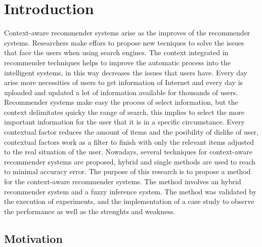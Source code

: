 \chapter{Introduction} \label{introduction} 

Context-aware recommender systems arise as the improves of 
the recommender systems. Researchers make effors to propose 
new tecniques to solve the issues that face the users when using 
search engines. The context integrated in recommender techniques 
helps to improve the automatic process into the intelligent systems, 
in this way decreases the issues that users have.
Every day arise more necessities of users to get information of  
Internet and every day  is uploaded and updated a lot of 
information available for thousands of users.
Recommender systems make easy the process of select information, but
the context delimitates quicky the range of search, this implies
to select the more important information for the user that it is 
in a specific circumstance. Every contextual factor reduces the
amount of items and the posibility of dislike of user, 
contextual factors work as a filter to finish with only 
the relevant items adjusted to the real situation of the user.
Nowadays, several techniques for context-aware recommender
systems are proposed, hybrid and single methods are used to
reach to minimal accuracy error. 
The purpose of this research is to propose a method for the
context-aware recommender systems. The method involves an 
hybrid recommender system and a fuzzy inference system. 
The method was validated by the execution of experiments, 
and the implementation of a case study to observe the 
performance as well as the strenghts and weakness.

\section{Motivation}

